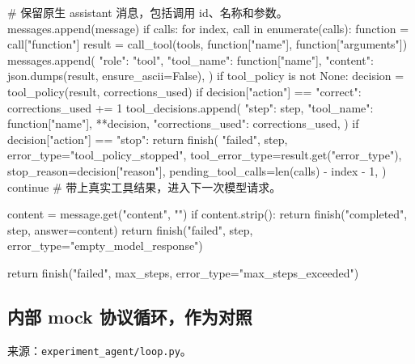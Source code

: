 \documentclass[UTF8,zihao=-4,fontset=fandol]{ctexart}
\begin{document}
\begin{Code}
        # 保留原生 assistant 消息，包括调用 id、名称和参数。
        messages.append(message)
        if calls:
            for index, call in enumerate(calls):
                function = call["function"]
                result = call_tool(tools, function["name"], function["arguments"])
                messages.append({
                    "role": "tool",
                    "tool_name": function["name"],
                    "content": json.dumps(result, ensure_ascii=False),
                })
                if tool_policy is not None:
                    decision = tool_policy(result, corrections_used)
                    if decision["action"] == "correct":
                        corrections_used += 1
                    tool_decisions.append({
                        "step": step,
                        "tool_name": function["name"],
                        **decision,
                        "corrections_used": corrections_used,
                    })
                    if decision["action"] == "stop":
                        return finish(
                            "failed", step,
                            error_type="tool_policy_stopped",
                            tool_error_type=result.get("error_type"),
                            stop_reason=decision["reason"],
                            pending_tool_calls=len(calls) - index - 1,
                        )
            continue  # 带上真实工具结果，进入下一次模型请求。

        content = message.get("content", "")
        if content.strip():
            return finish("completed", step, answer=content)
        return finish("failed", step, error_type="empty_model_response")

    return finish("failed", max_steps, error_type="max_steps_exceeded")
\end{Code}

\subsection{内部 mock 协议循环，作为对照}

来源：\nolinkurl{experiment_agent/loop.py}。
\end{document}
